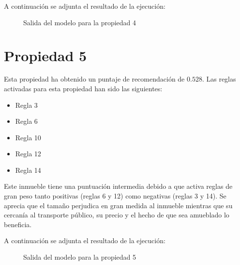 \documentclass[12pt]{report} %
\begin{document}
    A continuación se adjunta el resultado de la ejecución:
    \begin{figure}[H]
        \centering
        \caption{Salida del modelo para la propiedad 4}
    \end{figure}

    \section{Propiedad 5}
    Esta propiedad ha obtenido un puntaje de recomendación de $0.528$. Las reglas activadas para esta propiedad han sido las siguientes:
    \begin{itemize}
        \item Regla 3
        \item Regla 6
        \item Regla 10
        \item Regla 12
        \item Regla 14
    \end{itemize}

    Este inmueble tiene una puntuación intermedia debido a que activa reglas de
    gran peso tanto positivas (reglas 6 y 12) como negativas (reglas 3 y 14).
    Se aprecia que el tamaño perjudica en gran medida al inmueble mientras que
    su cercanía al transporte público, su precio y el hecho de que sea
    amueblado lo beneficia.

    A continuación se adjunta el resultado de la ejecución:
    \begin{figure}[H]
        \centering
        \caption{Salida del modelo para la propiedad 5}
    \end{figure}
     
\end{document}
